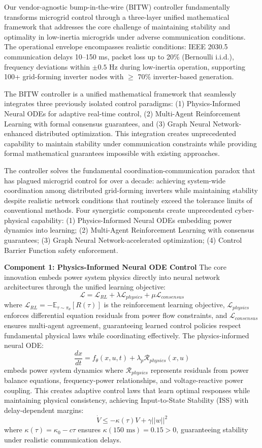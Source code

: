\documentclass[12pt]{article}
\begin{document}
Our vendor-agnostic bump-in-the-wire (BITW) controller fundamentally transforms microgrid control through a three-layer unified mathematical framework that addresses the core challenge of maintaining stability and optimality in low-inertia microgrids under adverse communication conditions. The operational envelope encompasses realistic conditions: IEEE 2030.5 communication delays 10--150 ms, packet loss up to 20\% (Bernoulli i.i.d.), frequency deviations within $\pm 0.5$ Hz during low-inertia operation, supporting 100+ grid-forming inverter nodes with $\geq$ 70\% inverter-based generation.

The BITW controller is a unified mathematical framework that seamlessly integrates three previously isolated control paradigms: (1) Physics-Informed Neural ODEs for adaptive real-time control, (2) Multi-Agent Reinforcement Learning with formal consensus guarantees, and (3) Graph Neural Network-enhanced distributed optimization. This integration creates unprecedented capability to maintain stability under communication constraints while providing formal mathematical guarantees impossible with existing approaches.

The controller solves the fundamental coordination-communication paradox that has plagued microgrid control for over a decade: achieving system-wide coordination among distributed grid-forming inverters while maintaining stability despite realistic network conditions that routinely exceed the tolerance limits of conventional methods. Four synergistic components create unprecedented cyber-physical capability: (1) Physics-Informed Neural ODEs embedding power dynamics into learning; (2) Multi-Agent Reinforcement Learning with consensus guarantees; (3) Graph Neural Network-accelerated optimization; (4) Control Barrier Function safety enforcement.

\textbf{Component 1: Physics-Informed Neural ODE Control}
The core innovation embeds power system physics directly into neural network architectures through the unified learning objective:
$$\mathcal{L} = \mathcal{L}_{RL} + \lambda \mathcal{L}_{physics} + \mu \mathcal{L}_{consensus}$$
where $\mathcal{L}_{RL} = -\mathbb{E}_{\tau \sim \pi_\theta}[R(\tau)]$ is the reinforcement learning objective, $\mathcal{L}_{physics}$ enforces differential equation residuals from power flow constraints, and $\mathcal{L}_{consensus}$ ensures multi-agent agreement, guaranteeing learned control policies respect fundamental physical laws while coordinating effectively. The physics-informed neural ODE:
$$\frac{dx}{dt} = f_\theta(x, u, t) + \lambda_p \mathcal{R}_{physics}(x, u)$$
embeds power system dynamics where $\mathcal{R}_{physics}$ represents residuals from power balance equations, frequency-power relationships, and voltage-reactive power coupling. This creates adaptive control laws that learn optimal responses while maintaining physical consistency, achieving Input-to-State Stability (ISS) with delay-dependent margins:
$$\dot{V} \leq -\kappa(\tau)V + \gamma||w||^2$$
where $\kappa(\tau) = \kappa_0 - c\tau$ ensures $\kappa(150\text{ ms}) = 0.15 > 0$, guaranteeing stability under realistic communication delays.
\end{document}
